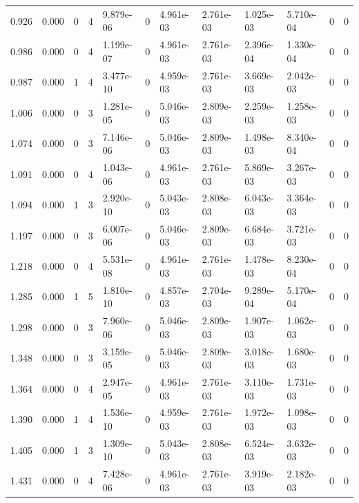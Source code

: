 \documentclass[preview]{standalone}
\begin{document}
{{\begin{tabular}{L{1.2cm}C{1.2cm} C{0.3cm}C{0.5cm} C{1.4cm}C{1.4cm} C{1.4cm}C{1.4cm} C{1.6cm}C{1.6cm} C{1.6cm}C{1.6cm}}
  0.926  &  0.000  & 0     &  4 &  9.879e-06  & 0  &  4.961e-03&   2.761e-03& 1.025e-03 & 5.710e-04   &  0 & 0  \\ 
  0.986  &  0.000  & 0     &  4 &  1.199e-07  & 0  &  4.961e-03&   2.761e-03& 2.396e-04 & 1.330e-04   &  0 & 0  \\ 
  0.987  &  0.000  & 1     &  4 &  3.477e-10  & 0  &  4.959e-03&   2.761e-03& 3.669e-03 & 2.042e-03   &  0 & 0  \\ 
  1.006  &  0.000  & 0     &  3 &  1.281e-05  & 0  &  5.046e-03&   2.809e-03& 2.259e-03 & 1.258e-03   &  0 & 0  \\ 
  1.074  &  0.000  & 0     &  3 &  7.146e-06  & 0  &  5.046e-03&   2.809e-03& 1.498e-03 & 8.340e-04   &  0 & 0  \\ 
  1.091  &  0.000  & 0     &  4 &  1.043e-06  & 0  &  4.961e-03&   2.761e-03& 5.869e-03 & 3.267e-03   &  0 & 0  \\ 
  1.094  &  0.000  & 1     &  3 &  2.920e-10  & 0  &  5.043e-03&   2.808e-03& 6.043e-03 & 3.364e-03   &  0 & 0  \\ 
  1.197  &  0.000  & 0     &  3 &  6.007e-06  & 0  &  5.046e-03&   2.809e-03& 6.684e-03 & 3.721e-03   &  0 & 0  \\ 
  1.218  &  0.000  & 0     &  4 &  5.531e-08  & 0  &  4.961e-03&   2.761e-03& 1.478e-03 & 8.230e-04   &  0 & 0  \\ 
  1.285  &  0.000  & 1     &  5 &  1.810e-10  & 0  &  4.857e-03&   2.704e-03& 9.289e-04 & 5.170e-04   &  0 & 0  \\ 
  1.298  &  0.000  & 0     &  3 &  7.960e-06  & 0  &  5.046e-03&   2.809e-03& 1.907e-03 & 1.062e-03   &  0 & 0  \\ 
  1.348  &  0.000  & 0     &  3 &  3.159e-05  & 0  &  5.046e-03&   2.809e-03& 3.018e-03 & 1.680e-03   &  0 & 0  \\ 
  1.364  &  0.000  & 0     &  4 &  2.947e-05  & 0  &  4.961e-03&   2.761e-03& 3.110e-03 & 1.731e-03   &  0 & 0  \\ 
  1.390  &  0.000  & 1     &  4 &  1.536e-10  & 0  &  4.959e-03&   2.761e-03& 1.972e-03 & 1.098e-03   &  0 & 0  \\ 
  1.405  &  0.000  & 1     &  3 &  1.309e-10  & 0  &  5.043e-03&   2.808e-03& 6.524e-03 & 3.632e-03   &  0 & 0  \\ 
  1.431  &  0.000  & 0     &  4 &  7.428e-06  & 0  &  4.961e-03&   2.761e-03& 3.919e-03 & 2.182e-03   &  0 & 0  \\ 
\hline 
\end{tabular} 

}}
\end{document}
